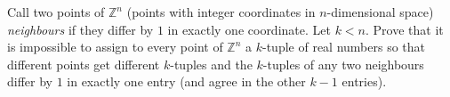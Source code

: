 Call two points of $\mathbb Z^n$ (points with integer coordinates in $n$-dimensional space) \emph{neighbours} if they differ by $1$ in exactly one coordinate. Let $k<n$. Prove that it is impossible to assign to every point of $\mathbb Z^n$ a $k$-tuple of real numbers so that different points get different $k$-tuples and the $k$-tuples of any two neighbours differ by $1$ in exactly one entry (and agree in the other $k-1$ entries).
